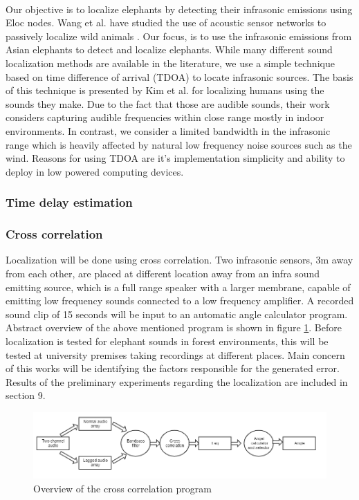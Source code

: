 \documentclass[12pt]{article}
\numberwithin{figure}{section}
\numberwithin{table}{section}
\begin{document}
\paragraph{}
Our objective is to localize elephants by detecting their infrasonic emissions using Eloc nodes. Wang et al. have studied the use of acoustic sensor networks to passively localize wild animals \cite{33}. Our focus, is to use the infrasonic emissions from Asian elephants to detect and localize elephants. While many different sound localization methods are available in the literature, we use a simple technique based on time difference of arrival (TDOA) to locate infrasonic sources. The basis of this technique is presented by Kim et al. \cite{34} for localizing humans using the sounds they make. Due to the fact that those are audible sounds, their work considers capturing audible frequencies within close range mostly in indoor environments. In contrast, we consider a limited bandwidth in the infrasonic range which is heavily affected by natural low frequency noise sources such
as the wind. Reasons for using TDOA are it's implementation simplicity and ability to deploy in low powered computing devices. 

\subsubsection{Time delay estimation}
\subsubsection{Cross correlation}

Localization will be done using cross correlation. Two infrasonic sensors, 3m away from each other, are placed at different location away from an infra sound emitting source, which is a full range speaker with a larger membrane, capable of emitting low frequency sounds connected to a low frequency amplifier. A recorded sound clip of 15 seconds will be input to an automatic angle calculator program. Abstract overview of the above mentioned program is shown in figure \ref{d:anglecal}. Before localization is tested for elephant sounds in  forest environments, this will be tested at university premises taking recordings at different places. Main concern of this works will be identifying the factors responsible for the generated error. Results of the preliminary experiments regarding the localization are included in section 9.

\begin{figure}[H]
\centering
\includegraphics[width= \textwidth]{anglecal.png}
\caption{Overview of the cross correlation program}
\label{d:anglecal}
\end{figure}
\end{document}
